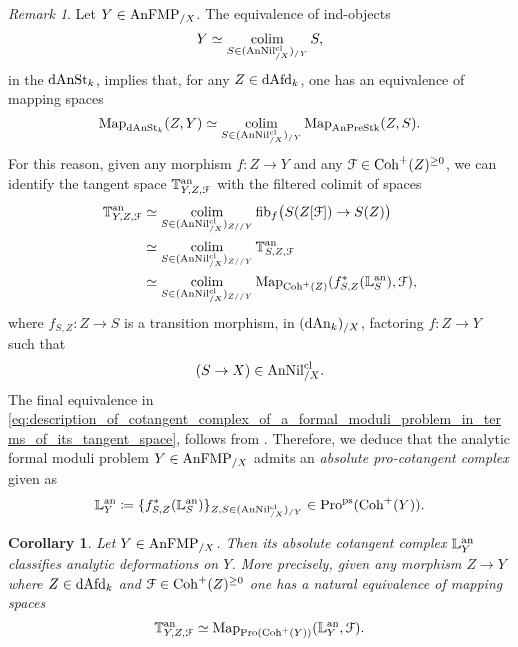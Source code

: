 \documentclass[10pt,a4paper,reqno]{amsart} %
\theoremstyle{plain}
\newtheorem{cor}[thm]{Corollary}
\theoremstyle{definition}
\theoremstyle{remark}
\newtheorem{rem}[thm]{Remark}
\numberwithin{equation}{section}
\begin{document}
\begin{rem} \label{rem:construction_of_analytic_cotangent_complex_of_analytic_FMP_over_X} Let $Y \in \mathrm{AnFMP}_{/X}$.
    The equivalence of ind-objects
        \[
            Y \simeq \operatorname*{colim}_{S \in (\mathrm{AnNil}^{\mathrm{cl}}_{/X})_{/Y}} S,
        \]
    in the \infcat $\mathrm{dAnSt}_k$, implies that, for any $Z \in \mathrm{dAfd}_k$, one has an equivalence of mapping spaces
        \[
            \operatorname{Map}_{\mathrm{dAnSt}_k}(Z, Y) \simeq \operatorname*{colim}_{S \in (\mathrm{AnNil}^{\mathrm{cl}}_{/X})_{/Y}}  \operatorname{Map}_{\mathrm{AnPreStk}}(Z,S ).
        \]
    For this reason, given any morphism $f \colon Z \to Y$ and any
    $\mathcal F \in \mathrm{Coh}^+(Z)^{\ge 0}$, we can identify the tangent space $\mathbb T^\mathrm{an}_{Y, Z, \mathcal F}$
    with the filtered colimit of spaces
        \begin{align} \label{eq:description_of_cotangent_complex_of_a_formal_moduli_problem_in_terms_of_its_tangent_space}
            \mathbb T^\mathrm{an}_{Y, Z, \mathcal F} & \simeq \operatorname*{colim}_{S \in (\mathrm{AnNil}^{\mathrm{cl}}_{/X})_{Z/ /Y}} \mathrm{fib}_f \big( S(Z[\mathcal F]) \to S(Z) \big) \\
                                & \simeq \operatorname*{colim}_{S \in (\mathrm{AnNil}^{\mathrm{cl}}_{/X})_{Z/ /Y}} \mathbb T^\mathrm{an}_{S, Z , \mathcal F } \\
                                & \simeq \operatorname*{colim}_{S \in (\mathrm{AnNil}^{\mathrm{cl}}_{/X})_{Z/ /Y}} \operatorname{Map}_{\mathrm{Coh}^+(Z)} (f_{S,Z}^* (\mathbb L^\mathrm{an}_S), \mathcal F),
        \end{align}
    where $f_{S, Z} \colon Z \to S$ is a transition morphism, in $(\mathrm{dAn}_k)_{/X}$, factoring $f \colon Z \to Y$ such that
        \[(S \to X) \in \mathrm{AnNil}^{\mathrm{cl}}_{/X}.\]
    The final equivalence in \eqref{eq:description_of_cotangent_complex_of_a_formal_moduli_problem_in_terms_of_its_tangent_space}, follows from \cite[Lemma 7.7]{Porta_Yu_Representability}.
    Therefore, we deduce that
    the analytic formal moduli problem
    $Y \in \mathrm{AnFMP}_{/X}$ admits an \emph{absolute pro-cotangent complex} given as
        \[
           \mathbb L^\mathrm{an}_Y \coloneqq \{ f^*_{S,Z}( \mathbb L^\mathrm{an}_S )  \}_{Z, S \in (\mathrm{AnNil}^{\mathrm{cl}}_{/X})_{/Y}} \in \mathrm{Pro}^\mathrm{ps}(\mathrm{Coh}^+(Y)).
        \]
\end{rem}   

\begin{cor}
    Let $Y \in \mathrm{AnFMP}_{/X}$. Then its absolute cotangent complex $\mathbb L^\mathrm{an}_Y$ classifies analytic deformations on $Y$. More precisely, given any morphism $Z \to Y$
    where $Z \in \mathrm{dAfd}_k$ and $\mathcal F \in \mathrm{Coh}^+(Z)^{\ge 0}$ one has a natural equivalence of mapping spaces
        \[
            \mathbb T^\mathrm{an}_{Y, Z, \mathcal F} \simeq \operatorname{Map}_{\mathrm{Pro}(\mathrm{Coh}^+(Y))}(\mathbb L^\mathrm{an}_Y, \mathcal F).  
        \]
\end{cor}
\end{document}

